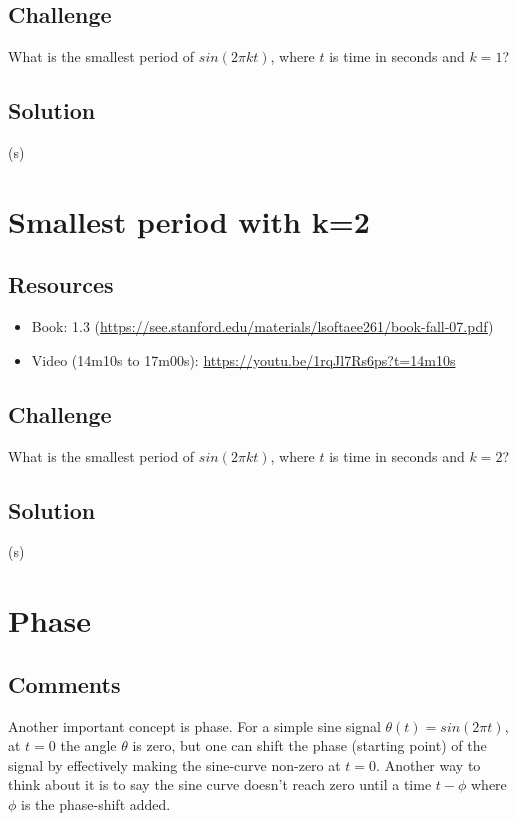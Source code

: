 \subsection*{Challenge}
What is the smallest period of $sin(2 \pi k t)$, where $t$ is time in seconds and $k=1$?

\subsection*{Solution}
(s)





\newpage

\section{Smallest period with k=2}

\subsection*{Resources}
\begin{itemize}
    \item Book: 1.3 (\url{https://see.stanford.edu/materials/lsoftaee261/book-fall-07.pdf})
    \item Video (14m10s to 17m00s): \url{https://youtu.be/1rqJl7Rs6ps?t=14m10s}
\end{itemize}

\subsection*{Challenge}
What is the smallest period of $sin(2 \pi k t)$, where $t$ is time in seconds and $k=2$?

\subsection*{Solution}
(s)





\newpage

\section{Phase}

\subsection*{Comments}
Another important concept is phase. For a simple sine signal $\theta(t) = sin(2 \pi t)$, at $t=0$ the angle $\theta$ is zero, but one can shift the phase (starting point) of the signal by effectively making the sine-curve non-zero at $t=0$. Another way to think about it is to say the sine curve doesn't reach zero until a time $t-\phi$ where $\phi$ is the phase-shift added.

